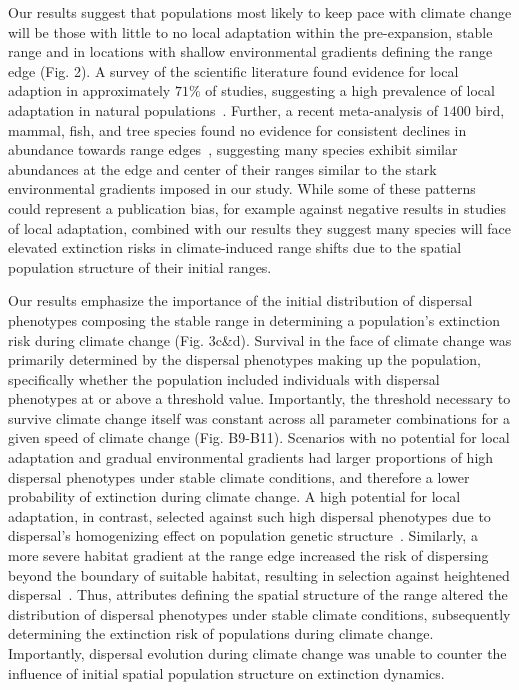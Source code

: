 \documentclass[12pt, oneside]{article}
\begin{document}
Our results suggest that populations most likely to keep pace with climate change will be those with little to no local adaptation within the pre-expansion, stable range and in locations with shallow environmental gradients defining the range edge (Fig. 2). A survey of the scientific literature found evidence for local adaption in approximately $71\%$ of studies, suggesting a high prevalence of local adaptation in natural populations~\citep{hereford2009quantitative}. Further, a recent meta-analysis of $1400$ bird, mammal, fish, and tree species found no evidence for consistent declines in abundance towards range edges~\citep{dallas2017species}, suggesting many species exhibit similar abundances at the edge and center of their ranges similar to the stark environmental gradients imposed in our study. While some of these patterns could represent a publication bias, for example against negative results in studies of local adaptation, combined with our results they suggest many species will face elevated extinction risks in climate-induced range shifts due to the spatial population structure of their initial ranges.

Our results emphasize the importance of the initial distribution of dispersal phenotypes composing the stable range in determining a population's extinction risk during climate change (Fig. 3c\&d). Survival in the face of climate change was primarily determined by the dispersal phenotypes making up the population, specifically whether the population included individuals with dispersal phenotypes at or above a threshold value. Importantly, the threshold necessary to survive climate change itself was constant across all parameter combinations for a given speed of climate change (Fig. B9-B11). Scenarios with no potential for local adaptation and gradual environmental gradients had larger proportions of high dispersal phenotypes under stable climate conditions, and therefore a lower probability of extinction during climate change. A high potential for local adaptation, in contrast, selected against such high dispersal phenotypes due to dispersal's homogenizing effect on population genetic structure~\citep{lenormand2002gene}. Similarly, a more severe habitat gradient at the range edge increased the risk of dispersing beyond the boundary of suitable habitat, resulting in selection against heightened dispersal~\citep{shaw2014population}. Thus, attributes defining the spatial structure of the range altered the distribution of dispersal phenotypes under stable climate conditions, subsequently determining the extinction risk of populations during climate change. Importantly, dispersal evolution during climate change was unable to counter the influence of initial spatial population structure on extinction dynamics.
\end{document}
